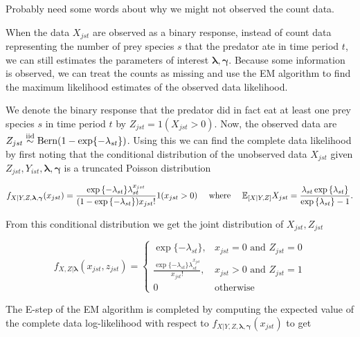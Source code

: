 Probably need some words about why we might not observed the count data.  

When the data $X_{jst}$ are observed as a binary response, instead of count data representing the number of prey species $s$ that the predator ate in time period $t$, we can still estimates the parameters of interest $\boldsymbol{\lambda}, \boldsymbol{\gamma}$.  Because some information is observed, we can treat the counts as missing and use the EM algorithm to find the maximum likelihood estimates of the observed data likelihood.  

We denote the binary response that the predator did in fact eat at least one prey species $s$ in time period $t$ by $Z_{jst} = 1(X_{jst} > 0)$.  Now, the observed data are $Z_{jst} \stackrel{\mathrm{iid}}{\sim} \text{Bern}(1-\exp\{-\lambda_{st}\})$.  Using this we can find the complete data likelihood by first noting that the conditional distribution of the unobserved data $X_{jst}$ given $Z_{jst}, Y_{ist}, \boldsymbol{\lambda}, \boldsymbol{\gamma}$ is a truncated Poisson distribution

\begin{equation*}
  f_{X|Y,Z,\boldsymbol{\lambda},\boldsymbol{\gamma}}(x_{jst}) =
  \frac{\exp{\{-\lambda_{st}\}} \lambda_{st}^{x_{jst}}}{(1 - \exp{\{-\lambda_{st}\}}) x_{jst}!}1(x_{jst} > 0) \quad \text{ where } \quad \mathbb{E}_{[X|Y,Z]}X_{jst} = \frac{\lambda_{st} \exp{\{\lambda_{st} \}}}{\exp{\{ \lambda_{st} \}} - 1}.
\end{equation*}

\noindent From this conditional distribution we get the joint distribution of $X_{jst}, Z_{jst}$

\begin{equation*}
    f_{X,Z|\boldsymbol{\lambda}}(x_{jst},z_{jst}) = \left\{
    \begin{array}{lr}
      \exp{\{ -\lambda_{st} \}}, & x_{jst}=0 \mbox{ and } Z_{jst} = 0 \\
      \frac{\exp{\{-\lambda_{st} \}} \lambda_{st}^{x_{jst}}}{x_{jst}!}, & x_{jst} > 0 \mbox{ and } Z_{jst} = 1\\
      0 & \mbox{otherwise}
    \end{array}
  \right.
\end{equation*}

\noindent The E-step of the EM algorithm is completed by computing the expected value of the complete data log-likelihood with respect to $f_{X|Y,Z,\boldsymbol{\lambda},\boldsymbol{\gamma}}(x_{jst})$ to get

